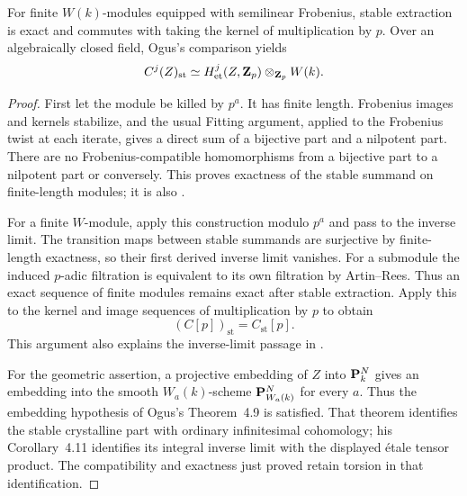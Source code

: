 \documentclass[11pt]{article}
\newcommand{\et}{\mathrm{et}}\newcommand{\crys}{\mathrm{crys}}
\newcommand{\st}{\mathrm{st}}\newcommand{\tors}{\mathrm{tors}}
\theoremstyle{definition}\newtheorem{definition}[theorem]{Definition}
\theoremstyle{remark}\newtheorem{remark}[theorem]{Remark}
\begin{document}
\begin{lemma}\label{lem:stable}
For finite $W(k)$-modules equipped with semilinear Frobenius, stable extraction is exact and commutes with taking the kernel of multiplication by $p$. Over an algebraically closed field, Ogus's comparison yields
\[
 C^j(Z)_{\st}\simeq H^j_{\et}(Z,\ZZ_p)\otimes_{\ZZ_p}W(k).
\]
\end{lemma}
\begin{proof}
First let the module be killed by $p^a$. It has finite length. Frobenius images and kernels stabilize, and the usual Fitting argument, applied to the Frobenius twist at each iterate, gives a direct sum of a bijective part and a nilpotent part. There are no Frobenius-compatible homomorphisms from a bijective part to a nilpotent part or conversely. This proves exactness of the stable summand on finite-length modules; it is also \citet[Lemma~4.8, p.~314]{Ogus}.

For a finite $W$-module, apply this construction modulo $p^a$ and pass to the inverse limit. The transition maps between stable summands are surjective by finite-length exactness, so their first derived inverse limit vanishes. For a submodule the induced $p$-adic filtration is equivalent to its own filtration by Artin--Rees. Thus an exact sequence of finite modules remains exact after stable extraction. Apply this to the kernel and image sequences of multiplication by $p$ to obtain
\[
 (C[p])_{\st}=C_{\st}[p].
\]
This argument also explains the inverse-limit passage in \citet[Remark~4.10]{Ogus}.

For the geometric assertion, a projective embedding of $Z$ into $\mathbf P^N_k$ gives an embedding into the smooth $W_a(k)$-scheme $\mathbf P^N_{W_a(k)}$ for every $a$. Thus the embedding hypothesis of Ogus's Theorem~4.9 is satisfied. That theorem identifies the stable crystalline part with ordinary infinitesimal cohomology; his Corollary~4.11 identifies its integral inverse limit with the displayed \'etale tensor product. The compatibility and exactness just proved retain torsion in that identification.
\end{proof}
\end{document}
